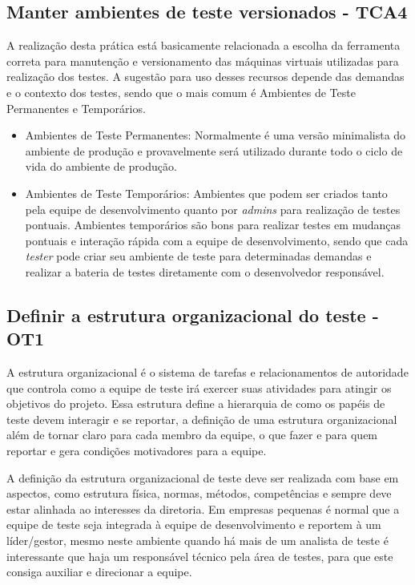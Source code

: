 \subsection{Manter ambientes de teste versionados - TCA4}
\label{sec:guiatca4}

A realização desta prática está basicamente relacionada a escolha da ferramenta correta para manutenção e versionamento das máquinas virtuais utilizadas para realização dos testes. A sugestão para uso desses recursos depende das demandas e o contexto dos testes, sendo que o mais comum é Ambientes de Teste Permanentes e Temporários.

\begin{itemize}
    \item Ambientes de Teste Permanentes: Normalmente é uma versão minimalista do ambiente de produção e provavelmente será utilizado durante todo o ciclo de vida do ambiente de produção.
    \item Ambientes de Teste Temporários: Ambientes que podem ser criados tanto pela equipe de desenvolvimento quanto por \textit{admins} para realização de testes pontuais. Ambientes temporários são bons para realizar testes em mudanças pontuais e interação rápida com a equipe de desenvolvimento, sendo que cada \textit{tester} pode criar seu ambiente de teste para determinadas demandas e realizar a bateria de testes diretamente com o desenvolvedor responsável.
\end{itemize}

\subsection{Definir a estrutura organizacional do teste - OT1}
\label{sec:guiaot1}

A estrutura organizacional é o sistema de tarefas e relacionamentos de autoridade que controla como a equipe de teste irá exercer suas atividades para atingir os objetivos do projeto. Essa estrutura define a hierarquia de como os papéis de teste devem interagir e se reportar, a definição de uma estrutura organizacional além de tornar claro para cada membro da equipe, o que fazer e para quem reportar e gera condições motivadores para a equipe.

A definição da estrutura organizacional de teste deve ser realizada com base em aspectos, como estrutura física, normas, métodos, competências e sempre deve estar alinhada ao interesses da diretoria. Em empresas pequenas é normal que a equipe de teste seja integrada à equipe de desenvolvimento e reportem à um líder/gestor, mesmo neste ambiente quando há mais de um analista de teste é interessante que haja um responsável técnico pela área de testes, para que este consiga auxiliar e direcionar a equipe.

